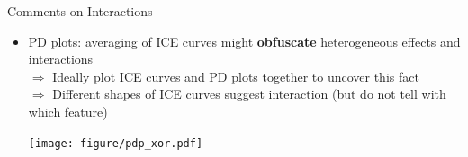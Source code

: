 \documentclass[11pt,compress,t,notes=noshow, aspectratio=169, xcolor=table]{beamer}
\begin{document}
%
%

\begin{frame}{Comments on Interactions}
\begin{itemize}

\item PD plots: averaging of ICE curves might \textbf{obfuscate} heterogeneous effects and interactions \\ 
\(\Rightarrow\) Ideally plot ICE curves and PD plots together to uncover this fact\\
\(\Rightarrow\) Different shapes of ICE curves suggest interaction (but do not tell with which  feature)

\begin{center}\texttt{[image: figure/pdp\_xor.pdf]} \end{center}
\end{itemize}

\end{frame}
\end{document}
